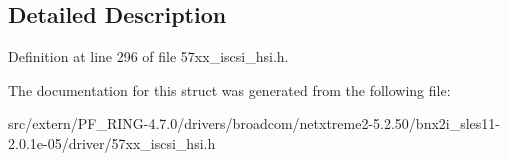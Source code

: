 \subsection{Detailed Description}


Definition at line 296 of file 57xx\_\-iscsi\_\-hsi.h.



The documentation for this struct was generated from the following file:\begin{DoxyCompactItemize}
\item 
src/extern/PF\_\-RING-\/4.7.0/drivers/broadcom/netxtreme2-\/5.2.50/bnx2i\_\-sles11-\/2.0.1e-\/05/driver/57xx\_\-iscsi\_\-hsi.h\end{DoxyCompactItemize}
